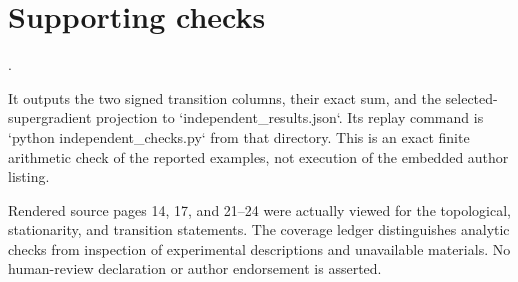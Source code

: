 \documentclass[10pt]{article}
\begin{document}
\section*{Supporting checks}
.\par
It outputs the two signed transition columns, their exact sum, and the selected-supergradient projection to `independent\_results.json`. Its replay command is `python independent\_checks.py` from that directory. This is an exact finite arithmetic check of the reported examples, not execution of the embedded author listing.\par
Rendered source pages 14, 17, and 21–24 were actually viewed for the topological, stationarity, and transition statements. The coverage ledger distinguishes analytic checks from inspection of experimental descriptions and unavailable materials. No human-review declaration or author endorsement is asserted.\par
\end{document}
